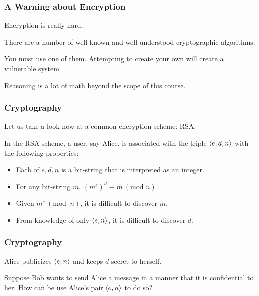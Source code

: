 \begin{frame}
\frametitle{A Warning about Encryption}
\begin{changemargin}{1cm}

Encryption is really hard.

There are a number of well-known and well-understood cryptographic algorithms.

You must use one of them. Attempting to create your own will create a vulnerable system.

Reasoning is a lot of math beyond the scope of this course.

\end{changemargin}
\end{frame}


\begin{frame}
\frametitle{Cryptography}
\begin{changemargin}{1cm}

Let us take a look now at a common encryption scheme: RSA.

In the RSA scheme, a user, say Alice, is associated with the
triple $\langle e, d, n \rangle$ with the following properties:

\begin{itemize}
    \item Each of $e, d, n$ is a bit-string that is interpreted as an integer.
    \item For any bit-string $m$, $\left(m^e\right)^d \equiv m~(\text{mod } n)$.
    \item Given $m^e~(\text{mod }~ n)$, it is difficult to discover $m$.
    \item From knowledge of only $\langle e, n \rangle$, it is difficult to discover $d$.
\end{itemize}


\end{changemargin}
\end{frame}


\begin{frame}
\frametitle{Cryptography}
\begin{changemargin}{1cm}

Alice publicizes $\langle e, n \rangle$ and keeps $d$ secret to herself.

Suppose Bob wants to send Alice a message in a manner that it is confidential
to her. How can be use Alice's pair $\langle e, n \rangle$ to do so?

\end{changemargin}
\end{frame}

